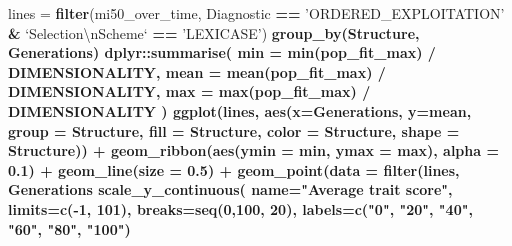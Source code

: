 \documentclass[]{book}
\newenvironment{Shaded}{\begin{snugshade}}{\end{snugshade}}
\newcommand{\CharTok}[1]{\textcolor[rgb]{0.31,0.60,0.02}{#1}}
\newcommand{\DataTypeTok}[1]{\textcolor[rgb]{0.13,0.29,0.53}{#1}}
\newcommand{\DecValTok}[1]{\textcolor[rgb]{0.00,0.00,0.81}{#1}}
\newcommand{\FloatTok}[1]{\textcolor[rgb]{0.00,0.00,0.81}{#1}}
\newcommand{\KeywordTok}[1]{\textcolor[rgb]{0.13,0.29,0.53}{\textbf{#1}}}
\newcommand{\NormalTok}[1]{#1}
\newcommand{\OperatorTok}[1]{\textcolor[rgb]{0.81,0.36,0.00}{\textbf{#1}}}
\newcommand{\StringTok}[1]{\textcolor[rgb]{0.31,0.60,0.02}{#1}}
\begin{document}
\begin{Shaded}
\begin{Highlighting}[]
\NormalTok{lines =}\StringTok{ }\KeywordTok{filter}\NormalTok{(mi50_over_time, Diagnostic }\OperatorTok{==}\StringTok{ 'ORDERED_EXPLOITATION'} \OperatorTok{&}\StringTok{ `}\DataTypeTok{Selection}\CharTok{\textbackslash{}n}\DataTypeTok{Scheme}\StringTok{`} \OperatorTok{==}\StringTok{ 'LEXICASE'}\NormalTok{) }\OperatorTok{%>%}
\StringTok{  }\KeywordTok{group_by}\NormalTok{(Structure, Generations) }\OperatorTok{%>%}
\StringTok{  }\NormalTok{dplyr}\OperatorTok{::}\KeywordTok{summarise}\NormalTok{(}
    \DataTypeTok{min =} \KeywordTok{min}\NormalTok{(pop_fit_max) }\OperatorTok{/}\StringTok{ }\NormalTok{DIMENSIONALITY,}
    \DataTypeTok{mean =} \KeywordTok{mean}\NormalTok{(pop_fit_max) }\OperatorTok{/}\StringTok{ }\NormalTok{DIMENSIONALITY,}
    \DataTypeTok{max =} \KeywordTok{max}\NormalTok{(pop_fit_max) }\OperatorTok{/}\StringTok{ }\NormalTok{DIMENSIONALITY}
\NormalTok{  )}
\KeywordTok{ggplot}\NormalTok{(lines, }\KeywordTok{aes}\NormalTok{(}\DataTypeTok{x=}\NormalTok{Generations, }\DataTypeTok{y=}\NormalTok{mean, }\DataTypeTok{group =}\NormalTok{ Structure, }\DataTypeTok{fill =}\NormalTok{ Structure, }\DataTypeTok{color =}\NormalTok{ Structure, }\DataTypeTok{shape =}\NormalTok{ Structure)) }\OperatorTok{+}
\StringTok{  }\KeywordTok{geom_ribbon}\NormalTok{(}\KeywordTok{aes}\NormalTok{(}\DataTypeTok{ymin =}\NormalTok{ min, }\DataTypeTok{ymax =}\NormalTok{ max), }\DataTypeTok{alpha =} \FloatTok{0.1}\NormalTok{) }\OperatorTok{+}
\StringTok{  }\KeywordTok{geom_line}\NormalTok{(}\DataTypeTok{size =} \FloatTok{0.5}\NormalTok{) }\OperatorTok{+}
\StringTok{  }\KeywordTok{geom_point}\NormalTok{(}\DataTypeTok{data =} \KeywordTok{filter}\NormalTok{(lines, Generations }\OperatorTok{%%}\StringTok{ }\DecValTok{2000} \OperatorTok{==}\StringTok{ }\DecValTok{0}\NormalTok{), }\DataTypeTok{size =} \FloatTok{2.5}\NormalTok{, }\DataTypeTok{stroke =} \FloatTok{2.0}\NormalTok{, }\DataTypeTok{alpha =} \FloatTok{1.0}\NormalTok{) }\OperatorTok{+}
\StringTok{  }\KeywordTok{scale_y_continuous}\NormalTok{(}
    \DataTypeTok{name=}\StringTok{"Average trait score"}\NormalTok{,}
    \DataTypeTok{limits=}\KeywordTok{c}\NormalTok{(}\OperatorTok{-}\DecValTok{1}\NormalTok{, }\DecValTok{101}\NormalTok{),}
    \DataTypeTok{breaks=}\KeywordTok{seq}\NormalTok{(}\DecValTok{0}\NormalTok{,}\DecValTok{100}\NormalTok{, }\DecValTok{20}\NormalTok{),}
    \DataTypeTok{labels=}\KeywordTok{c}\NormalTok{(}\StringTok{"0"}\NormalTok{, }\StringTok{"20"}\NormalTok{, }\StringTok{"40"}\NormalTok{, }\StringTok{"60"}\NormalTok{, }\StringTok{"80"}\NormalTok{, }\StringTok{"100"}\NormalTok{)}
}}}
\end{Highlighting}
\end{Shaded}
\end{document}
